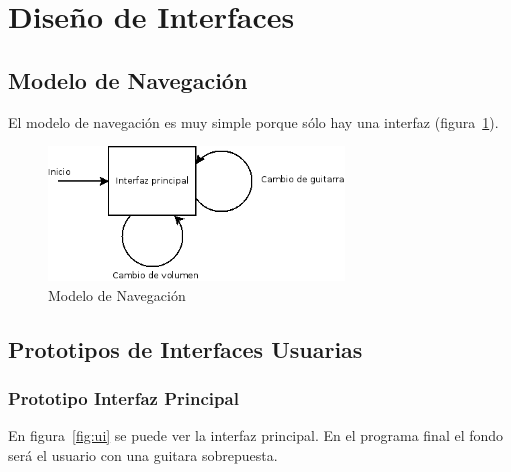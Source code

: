 \documentclass[a4paper,10pt]{article}
\begin{document}
\newpage

\section{Diseño de Interfaces}
\subsection{Modelo de Navegación}
El modelo de navegación es muy simple porque sólo hay una interfaz
(figura~\ref{fig:navegacion}).

\begin{figure}[hb]
        \centering
        \includegraphics[width=0.7\textwidth]{../imagenes/modelo_de_navegacion.png}
        \caption{Modelo de Navegación}
        \label{fig:navegacion}
\end{figure}
\subsection{Prototipos de Interfaces Usuarias}
\subsubsection{Prototipo Interfaz Principal}
En figura~\ref{fig:ui} se puede ver la interfaz principal. En el programa final
el fondo será el usuario con una guitara sobrepuesta.
\end{document}

